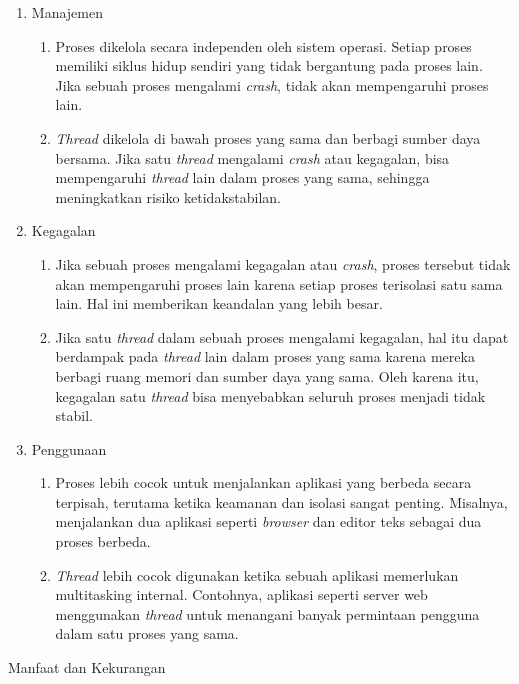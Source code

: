 \documentclass[12pt]{article}
\begin{document}
\begin{enumerate}
          \item Manajemen
                \begin{enumerate}
                    \item Proses dikelola secara independen oleh sistem operasi. Setiap proses memiliki siklus hidup sendiri yang tidak bergantung pada proses lain. Jika sebuah proses mengalami \textit{crash}, tidak akan mempengaruhi proses lain.
                    \item \textit{Thread} dikelola di bawah proses yang sama dan berbagi sumber daya bersama. Jika satu \textit{thread} mengalami \textit{crash} atau kegagalan, bisa mempengaruhi \textit{thread} lain dalam proses yang sama, sehingga meningkatkan risiko ketidakstabilan.
                \end{enumerate}
          \item Kegagalan
                \begin{enumerate}
                    \item Jika sebuah proses mengalami kegagalan atau \textit{crash}, proses tersebut tidak akan mempengaruhi proses lain karena setiap proses terisolasi satu sama lain. Hal ini memberikan keandalan yang lebih besar.
                    \item Jika satu \textit{thread} dalam sebuah proses mengalami kegagalan, hal itu dapat berdampak pada \textit{thread} lain dalam proses yang sama karena mereka berbagi ruang memori dan sumber daya yang sama. Oleh karena itu, kegagalan satu \textit{thread} bisa menyebabkan seluruh proses menjadi tidak stabil.
                \end{enumerate}
          \item Penggunaan
                \begin{enumerate}
                    \item Proses lebih cocok untuk menjalankan aplikasi yang berbeda secara terpisah, terutama ketika keamanan dan isolasi sangat penting. Misalnya, menjalankan dua aplikasi seperti \textit{browser} dan editor teks sebagai dua proses berbeda.
                    \item \textit{Thread} lebih cocok digunakan ketika sebuah aplikasi memerlukan multitasking internal. Contohnya, aplikasi seperti server web menggunakan \textit{thread} untuk menangani banyak permintaan pengguna dalam satu proses yang sama.
                \end{enumerate}
      \end{enumerate}
\item Manfaat dan Kekurangan
\end{document}
